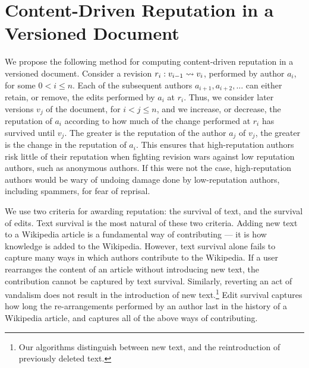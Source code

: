 \section{Content-Driven Reputation in a Versioned Document} 

We propose the following method for computing content-driven
reputation in a versioned document. 
Consider a revision $r_i: v_{i-1} \rightsquigarrow v_i$, performed by author $a_i$, 
for some $0 < i \leq n$. 
Each of the subsequent authors $a_{i+1}, a_{i+2}, \ldots$ can either
retain, or remove, the edits performed by $a_i$ at $r_i$.
Thus, we consider later versions $v_j$ of the document, for $i < j
\leq n$, and we increase, or decrease, the reputation of $a_i$
according to how much of the change performed at $r_i$ has survived
until $v_j$. 
The greater is the reputation of the author $a_j$ of $v_j$, 
the greater is the change in the reputation of $a_i$. 
This ensures that high-reputation authors risk little of 
their reputation when fighting revision wars against low
reputation authors, such as anonymous authors. 
If this were not the case, high-reputation authors would be wary of
undoing damage done by low-reputation authors, including spammers, for
fear of reprisal.

We use two criteria for awarding reputation: the survival of text, and
the survival of edits.
Text survival is the most natural of these two criteria. 
Adding new text to a Wikipedia article is a fundamental way of
contributing --- it is how knowledge is added to the Wikipedia. 
However, text survival alone fails to capture many ways in which authors
contribute to the Wikipedia. 
If a user rearranges the content of an article without introducing new
text, the contribution cannot be captured by text survival. 
Similarly, reverting an act of vandalism does not result in the
introduction of new text.\footnote{Our algorithms distinguish between
new text, and the reintroduction of previously deleted text.}
Edit survival captures how long the re-arrangements performed by an
author last in the history of a Wikipedia article, and captures all of
the above ways of contributing. 



